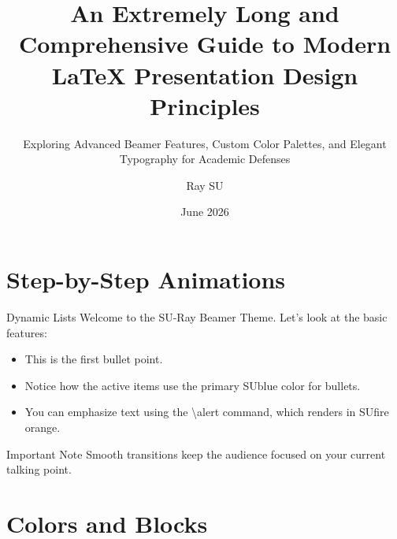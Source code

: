 \documentclass[aspectratio=169]{beamer}
\title{An Extremely Long and Comprehensive Guide to Modern LaTeX Presentation Design Principles}
\subtitle{Exploring Advanced Beamer Features, Custom Color Palettes, and Elegant Typography for Academic Defenses}
\author{Ray SU}
\institute{Department of Computer and Systems Sciences}
\date{June 2026}
\begin{document}
\SUtitlepage 

\SUtocpage

\section{Step-by-Step Animations}

\begin{frame}{Dynamic Lists}
    Welcome to the SU-Ray Beamer Theme. Let's look at the basic features:
    \vspace{0.3cm}
    \begin{itemize}
        \item This is the first bullet point. \pause
        \item Notice how the active items use the primary \alert{SUblue} color for bullets. \pause
        \item You can emphasize text using the \textbackslash alert command, which renders in \alert{SUfire} orange. \pause
    \end{itemize}
    
    \vspace{0.3cm}
    \begin{alertblock}{Important Note}
        Smooth transitions keep the audience focused on your current talking point.
    \end{alertblock}
\end{frame}

\section{Colors and Blocks}
\end{document}
